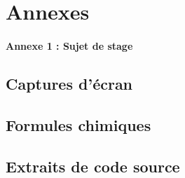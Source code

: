 \appendix
\chapter{Annexes}
\subsubsection{Annexe 1 : Sujet de stage}
\section{Captures d'écran}

\section{Formules chimiques}

\section{Extraits de code source}